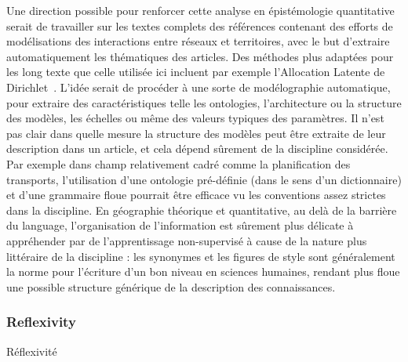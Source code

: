 {Une direction possible pour renforcer cette analyse en épistémologie quantitative serait de travailler sur les textes complets des références contenant des efforts de modélisations des interactions entre réseaux et territoires, avec le but d'extraire automatiquement les thématiques des articles. Des méthodes plus adaptées pour les long texte que celle utilisée ici incluent par exemple l'Allocation Latente de Dirichlet~\cite{blei2003latent}. L'idée serait de procéder à une sorte de modélographie automatique, pour extraire des caractéristiques telle les ontologies, l'architecture ou la structure des modèles, les échelles ou même des valeurs typiques des paramètres. Il n'est pas clair dans quelle mesure la structure des modèles peut être extraite de leur description dans un article, et cela dépend sûrement de la discipline considérée. Par exemple dans champ relativement cadré comme la planification des transports, l'utilisation d'une ontologie pré-définie (dans le sens d'un dictionnaire) et d'une grammaire floue pourrait être efficace vu les conventions assez strictes dans la discipline. En géographie théorique et quantitative, au delà de la barrière du language, l'organisation de l'information est sûrement plus délicate à appréhender par de l'apprentissage non-supervisé à cause de la nature plus littéraire de la discipline : les synonymes et les figures de style sont généralement la norme pour l'écriture d'un bon niveau en sciences humaines, rendant plus floue une possible structure générique de la description des connaissances.
}






\subsubsection{Reflexivity}{Réflexivité}


